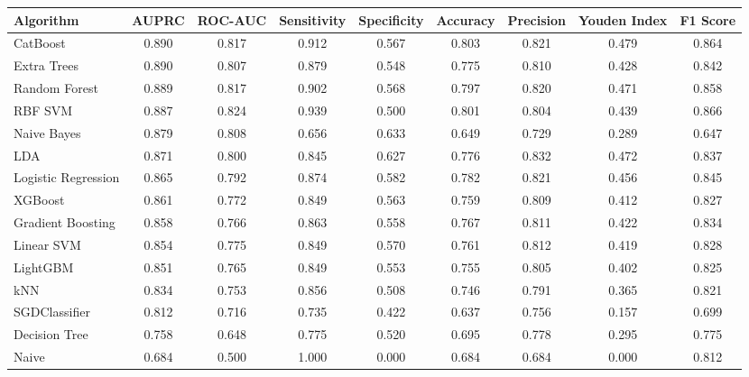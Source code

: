 \documentclass[pdflatex,sn-vancouver-num]{sn-jnl}
\begin{document}
\begin{table}[h!]
\centering
\footnotesize
\begin{tabular}{lcccccccc}
\toprule
Algorithm & AUPRC & ROC-AUC & Sensitivity & Specificity & Accuracy & Precision & Youden Index & F1 Score\\
\midrule
CatBoost & 0.890 & 0.817 & 0.912 & 0.567 & 0.803 & 0.821 & 0.479 & 0.864 \\
Extra Trees & 0.890 & 0.807 & 0.879 & 0.548 & 0.775 & 0.810 & 0.428 & 0.842 \\
Random Forest & 0.889 & 0.817 & 0.902 & 0.568 & 0.797 & 0.820 & 0.471 & 0.858 \\
RBF SVM & 0.887 & 0.824 & 0.939 & 0.500 & 0.801 & 0.804 & 0.439 & 0.866 \\
Naive Bayes & 0.879 & 0.808 & 0.656 & 0.633 & 0.649 & 0.729 & 0.289 & 0.647 \\
LDA & 0.871 & 0.800 & 0.845 & 0.627 & 0.776 & 0.832 & 0.472 & 0.837 \\
Logistic Regression & 0.865 & 0.792 & 0.874 & 0.582 & 0.782 & 0.821 & 0.456 & 0.845 \\
XGBoost & 0.861 & 0.772 & 0.849 & 0.563 & 0.759 & 0.809 & 0.412 & 0.827 \\
Gradient Boosting & 0.858 & 0.766 & 0.863 & 0.558 & 0.767 & 0.811 & 0.422 & 0.834 \\
Linear SVM & 0.854 & 0.775 & 0.849 & 0.570 & 0.761 & 0.812 & 0.419 & 0.828 \\
LightGBM & 0.851 & 0.765 & 0.849 & 0.553 & 0.755 & 0.805 & 0.402 & 0.825 \\
kNN & 0.834 & 0.753 & 0.856 & 0.508 & 0.746 & 0.791 & 0.365 & 0.821 \\
SGDClassifier & 0.812 & 0.716 & 0.735 & 0.422 & 0.637 & 0.756 & 0.157 & 0.699 \\
Decision Tree & 0.758 & 0.648 & 0.775 & 0.520 & 0.695 & 0.778 & 0.295 & 0.775 \\
Naive & 0.684 & 0.500 & 1.000 & 0.000 & 0.684 & 0.684 & 0.000 & 0.812 \\
\bottomrule
\end{tabular}

\end{table}
\end{document}
